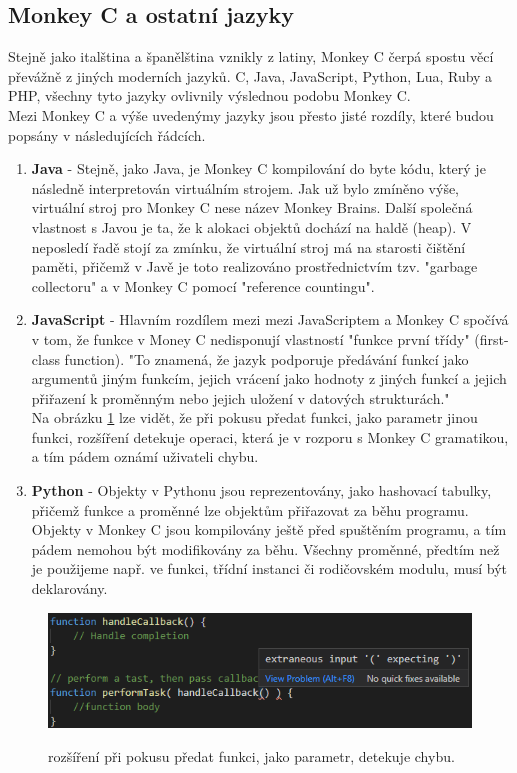 \subsection{Monkey C a ostatní jazyky}
Stejně jako italština a španělština vznikly z latiny, Monkey C čerpá spostu věcí převážně z jiných moderních jazyků. C, Java, JavaScript, Python, Lua, Ruby a PHP, všechny tyto jazyky ovlivnily výslednou podobu Monkey C. \cite{monkeyc_2021} \\
Mezi Monkey C a výše uvedenýmy jazyky jsou přesto jisté rozdíly, které budou popsány v následujících řádcích.
\begin{enumerate}
\item \textbf{Java} - Stejně, jako Java, je Monkey C kompilování do byte kódu, který je následně interpretován virtuálním strojem. Jak už bylo zmíněno výše, virtuální stroj pro Monkey C nese název Monkey Brains. Další společná vlastnost s Javou je ta, že k alokaci objektů dochází na haldě (heap). V neposledí řadě stojí za zmínku, že virtuální stroj má na starosti čištění paměti, přičemž v Javě je toto realizováno prostřednictvím tzv. "garbage collectoru" a v Monkey C pomocí "reference countingu".
\item \textbf{JavaScript} - Hlavním rozdílem mezi mezi JavaScriptem a Monkey C spočívá v tom, že funkce v Money C nedisponují vlastností "funkce první třídy" (first-class function). "To znamená, že jazyk podporuje předávání funkcí jako argumentů jiným funkcím, jejich vrácení jako hodnoty z jiných funkcí a jejich přiřazení k proměnným nebo jejich uložení v datových strukturách." \cite{abelson1996structure}\\ Na obrázku \ref{img:callback_error} lze vidět, že při pokusu předat funkci, jako parametr jinou funkci, rozšíření detekuje operaci, která je v rozporu s Monkey C gramatikou, a tím pádem oznámí uživateli chybu.
\item \textbf{Python} - Objekty v Pythonu jsou reprezentovány, jako hashovací tabulky, přičemž funkce a proměnné lze objektům přiřazovat za běhu programu. Objekty v Monkey C jsou kompilovány ještě před spuštěním programu, a tím pádem nemohou být modifikovány za běhu. Všechny proměnné, předtím než je použijeme např. ve funkci, třídní instanci či rodičovském modulu, musí být deklarovány.
\end{enumerate}

\begin{figure}[h!]
	\centering
	\includegraphics{images/callback_error}
	\\
	\caption{rozšíření při pokusu předat funkci, jako parametr, detekuje chybu.}
	\label{img:callback_error}
\end{figure}

\endinput